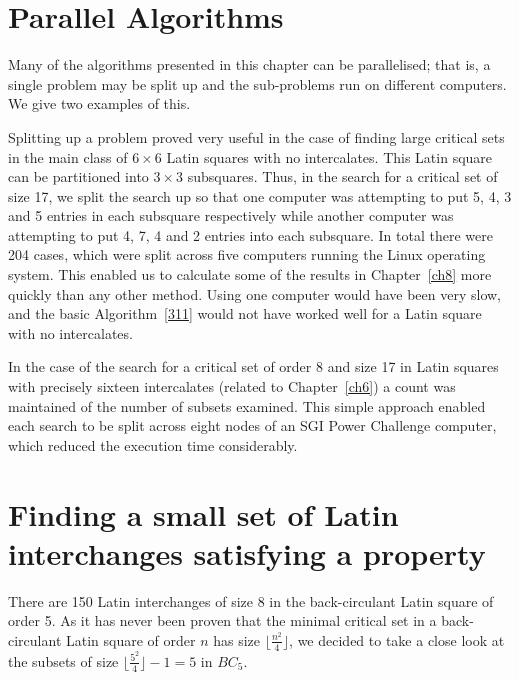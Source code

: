 \documentclass[12pt]{report}
\begin{document}
\section{Parallel Algorithms}
Many of the algorithms presented in this chapter can be parallelised;
that is, a single problem may be split up and the sub-problems run
on different computers.  We give two examples of this.

Splitting up a problem proved very useful in the case of finding large
critical sets in the main class of $6 \times 6$ Latin squares with
no intercalates.  This Latin square can be partitioned into $3 \times 3$
subsquares.  Thus, in the search for a critical set of size 17, 
we split the search up so that one computer was attempting to put 5, 4, 3
and 5 entries in each subsquare respectively while another computer
was attempting to put 4, 7, 4 and 2 entries into each subsquare.
In total there were 204 cases, which were split across five computers
running the Linux operating system.  This enabled us to calculate
some of the results in Chapter~\ref{ch8}  more quickly than any other method.
Using one computer would have been very slow, and the basic Algorithm~\ref{311}
would not have worked well for a Latin square with no intercalates.

In the case of the search for a critical set of order 8 and size 17
in Latin squares with precisely sixteen intercalates (related to Chapter~\ref{ch6})
a count was maintained of the number of subsets examined.  This simple
approach enabled each search to be split across eight nodes of an SGI
Power Challenge computer, which reduced the execution time considerably.







\section{Finding a small set of Latin interchanges satisfying a property}

There are 150 Latin interchanges of size 8 in the back-circulant Latin
square of order 5.  As it has never been proven that the minimal critical
set in a back-circulant Latin square of order $n$ has size 
$\lfloor \displaystyle{\frac{n^2}{4}} \rfloor$, we decided to take a close look
at the subsets of size $\lfloor \displaystyle{\frac{5^2}{4}} \rfloor - 1 = 5$ in $BC_5$.
\end{document}
